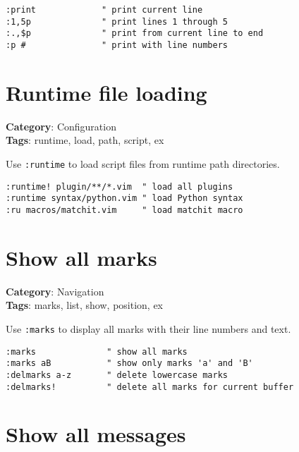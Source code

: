 {{{{{{\begin{Exa*}{}
\begin{Verbatim}[fontsize=\footnotesize, breaklines, breakanywhere]
:print             " print current line
:1,5p              " print lines 1 through 5
:.,$p              " print from current line to end
:p #               " print with line numbers
\end{Verbatim}
\end{Exa*}

\section{Runtime file loading}

\textbf{Category}: Configuration\\ \textbf{Tags}: runtime, load, path, script, ex
\vspace{0.5cm}

Use {\footnotesize \Verb§:runtime§} to load script files from runtime path directories.

\begin{Exa*}{}
\begin{Verbatim}[fontsize=\footnotesize, breaklines, breakanywhere]
:runtime! plugin/**/*.vim  " load all plugins
:runtime syntax/python.vim " load Python syntax
:ru macros/matchit.vim     " load matchit macro
\end{Verbatim}
\end{Exa*}

\section{Show all marks}

\textbf{Category}: Navigation\\ \textbf{Tags}: marks, list, show, position, ex
\vspace{0.5cm}

Use {\footnotesize \Verb§:marks§} to display all marks with their line numbers and text.

\begin{Exa*}{}
\begin{Verbatim}[fontsize=\footnotesize, breaklines, breakanywhere]
:marks              " show all marks
:marks aB           " show only marks 'a' and 'B'
:delmarks a-z       " delete lowercase marks
:delmarks!          " delete all marks for current buffer
\end{Verbatim}
\end{Exa*}

\section{Show all messages}

}}}}}}
